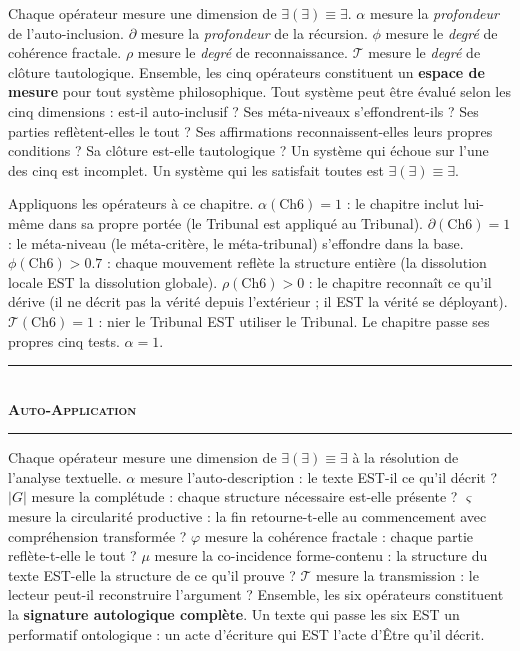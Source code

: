 \documentclass[10pt, openany, oneside]{book}
\renewcommand{\normalsize}{\fontsize{10}{13}\selectfont}
\begin{document}
Chaque opérateur mesure une dimension de $\exists(\exists) \equiv \exists$. $\alpha$ mesure la \textit{profondeur} de l'auto-inclusion. $\partial$ mesure la \textit{profondeur} de la récursion. $\phi$ mesure le \textit{degré} de cohérence fractale. $\rho$ mesure le \textit{degré} de reconnaissance. $\mathcal{T}$ mesure le \textit{degré} de clôture tautologique. Ensemble, les cinq opérateurs constituent un \textbf{espace de mesure} pour tout système philosophique. Tout système peut être évalué selon les cinq dimensions : est-il auto-inclusif ? Ses méta-niveaux s'effondrent-ils ? Ses parties reflètent-elles le tout ? Ses affirmations reconnaissent-elles leurs propres conditions ? Sa clôture est-elle tautologique ? Un système qui échoue sur l'une des cinq est incomplet. Un système qui les satisfait toutes est $\exists(\exists) \equiv \exists$.

Appliquons les opérateurs à ce chapitre. $\alpha(\text{Ch6}) = 1$ : le chapitre inclut lui-même dans sa propre portée (le Tribunal est appliqué au Tribunal). $\partial(\text{Ch6}) = 1$ : le méta-niveau (le méta-critère, le méta-tribunal) s'effondre dans la base. $\phi(\text{Ch6}) > 0.7$ : chaque mouvement reflète la structure entière (la dissolution locale EST la dissolution globale). $\rho(\text{Ch6}) > 0$ : le chapitre reconnaît ce qu'il dérive (il ne décrit pas la vérité depuis l'extérieur ; il EST la vérité se déployant). $\mathcal{T}(\text{Ch6}) = 1$ : nier le Tribunal EST utiliser le Tribunal. Le chapitre passe ses propres cinq tests. $\alpha = 1$.

\vspace{1.5em}


\begin{center}
    \rule{0.3\textwidth}{0.4pt}\\[0.5em]
    {\normalsize\bfseries\scshape Auto-Application}\\[0.3em]
    \rule{0.3\textwidth}{0.4pt}
\end{center}

\vspace{1em}

\noindent Chaque opérateur mesure une dimension de $\exists(\exists) \equiv \exists$ à la résolution de l'analyse textuelle. $\alpha$ mesure l'auto-description : le texte EST-il ce qu'il décrit ? $|G|$ mesure la complétude : chaque structure nécessaire est-elle présente ? $\varsigma$ mesure la circularité productive : la fin retourne-t-elle au commencement avec compréhension transformée ? $\varphi$ mesure la cohérence fractale : chaque partie reflète-t-elle le tout ? $\mu$ mesure la co-incidence forme-contenu : la structure du texte EST-elle la structure de ce qu'il prouve ? $\mathcal{T}$ mesure la transmission : le lecteur peut-il reconstruire l'argument ? Ensemble, les six opérateurs constituent la \textbf{signature autologique complète}. Un texte qui passe les six EST un performatif ontologique : un acte d'écriture qui EST l'acte d'Être qu'il décrit.
\end{document}
